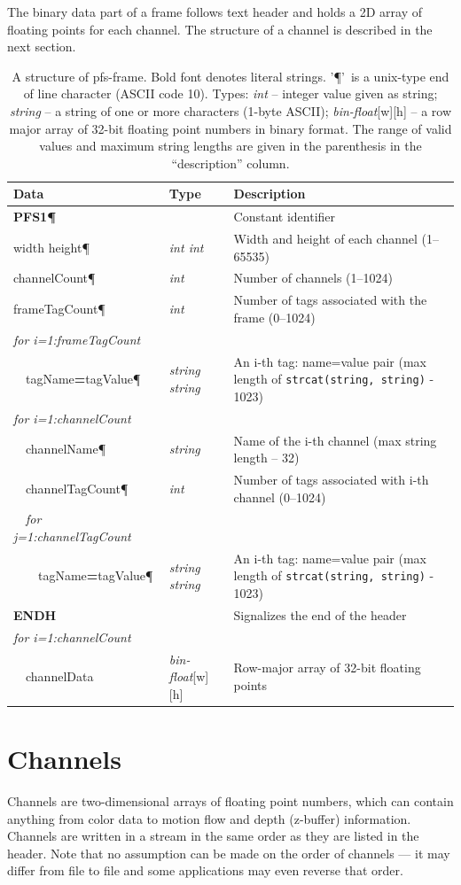 \documentclass[a4paper,12pt,english]{article}
\providecommand{\tabularnewline}{\\}
\begin{document}
The binary data part of a frame follows text header and holds a 2D
array of floating points for each channel. The structure of a channel
is described in the next section.
%
\begin{table}
\begin{tabular}{|l|l|p{5cm}|}
\hline 
Data&
Type&
Description\tabularnewline
\hline
\hline 
\textbf{PFS1\P}&
&
Constant identifier\tabularnewline
\hline 
width height\P&
\emph{int int}&
Width and height of each channel (1--65535) \tabularnewline
\hline 
channelCount\P&
\emph{int}&
Number of channels (1--1024)\tabularnewline
\hline 
frameTagCount\P&
\emph{int}&
Number of tags associated with the frame (0--1024)\tabularnewline
\hline
\emph{for i=1:frameTagCount}&
&
\tabularnewline
\hline
~~tagName\textbf{=}tagValue\P&
\emph{string string}&
An i-th tag: name=value pair (max length of \texttt{strcat(string, string)} - 1023)\tabularnewline
\hline
\emph{for i=1:channelCount}&
&
\tabularnewline
\hline
~~channelName\P&
\emph{string}&
Name of the i-th channel (max string length -- 32)\tabularnewline
\hline
~~channelTagCount\P&
\emph{int}&
Number of tags associated with i-th channel (0--1024)\tabularnewline
\hline
~~\emph{for j=1:channelTagCount}&
&
\tabularnewline
\hline
~~~~tagName\textbf{=}tagValue\P&
\emph{string string}&
An i-th tag: name=value pair (max length of \texttt{strcat(string, string)} - 1023)\tabularnewline
\hline
\textbf{ENDH}&
&
Signalizes the end of the header\tabularnewline
\hline
\emph{for i=1:channelCount}&
&
\tabularnewline
\hline
~~channelData&
\emph{bin-float}{[}w{]}{[}h{]}&
Row-major array of 32-bit floating points\tabularnewline
\hline
\end{tabular}


\caption{\label{cap:pfs-frame}A structure of pfs-frame. Bold font denotes
  literal strings. '\P'~is a unix-type end of line character
  (ASCII code 10). Types: \emph{int} -- integer value given as string;
  \emph{string} -- a string of one or more characters (1-byte ASCII); \emph{bin-float}{[}w{]}{[}h{]}
  -- a row major array of 32-bit floating point numbers in binary format. The range of valid values and maximum string lengths are given in the parenthesis in the ``description'' column.}
\end{table}

\section{Channels}

Channels are two-dimensional arrays of floating point numbers, which
can contain anything from color data to motion flow and depth (z-buffer)
information.  Channels are written in a stream in the same order as they
are listed in the header. Note that no assumption can be made on the
order of channels --- it may differ from file to file and some
applications may even reverse that order.
\end{document}
